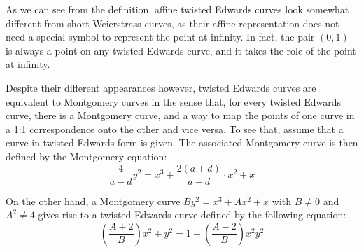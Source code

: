 As we can see from the definition, affine twisted Edwards curves look somewhat different from short Weierstrass curves, as their affine representation does not need a special symbol to represent the point at infinity. In fact, the pair $(0,1)$ is always a point on any twisted Edwards curve, and it takes the role of the point at infinity.

Despite their different appearances however, twisted Edwards curves are equivalent to Montgomery curves in the sense that, for every twisted Edwards curve, there is a Montgomery curve, and a way to map the points of one curve in a 1:1 correspondence onto the other and vice versa. To see that, assume that a curve in twisted Edwards form is given. The associated Montgomery curve is then defined by the Montgomery equation:
\begin{equation}
\frac{4}{a-d} y^2 = x^3 + \frac{2(a+d)}{a-d}\cdot x^2 + x 
\end{equation}

On the other hand, a Montgomery curve $By^{2}=x^{3}+Ax^{2}+x$ with $B\neq 0$ and $A^2\neq 4$ gives rise to a twisted Edwards curve defined by the following equation:
\begin{equation}\label{eq:montgomery-to-twisted-edwards}
(\frac{A+2}{B})x^2+y^2= 1+(\frac{A-2}{B})x^2y^2
\end{equation}

